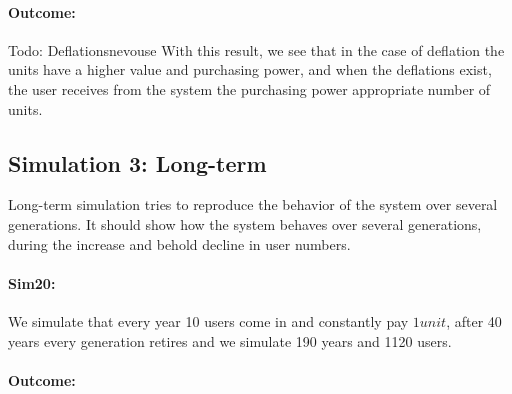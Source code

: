 \paragraph{Outcome:}

\begin{table}[hbt!]
\centering
{}
\end{table}

Todo: Deflationsnevouse
With this result, we see that in the case of deflation the units have a higher value and purchasing power, and when the deflations exist, the user receives from the system the purchasing power appropriate number of units.


\subsection{Simulation 3: Long-term}

Long-term simulation tries to reproduce the behavior of the system over several generations. It should show how the system behaves over several generations, during the increase and behold decline in user numbers.

\paragraph{Sim20:} We simulate that every year 10 users come in and constantly pay $1 unit$, after 40 years every generation retires and we simulate 190 years and 1120 users.

\paragraph{Outcome:}

